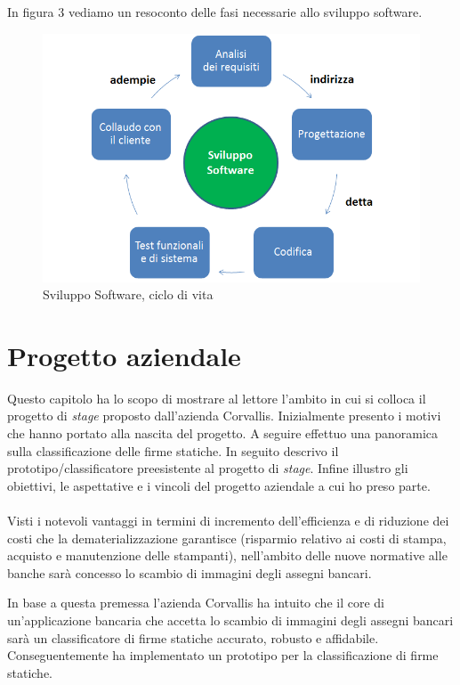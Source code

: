 In figura 3 vediamo un resoconto delle fasi necessarie allo sviluppo software.
\begin{figure}[H]
\centering
\includegraphics[scale=0.55]{../Logo&Header/sviluppoSoftware.png}
\caption{ Sviluppo Software, ciclo di vita}
\end{figure}

\newpage
\newpage

\section{Progetto aziendale}
\label{2.0}
Questo capitolo ha lo scopo di mostrare al lettore l'ambito in cui si colloca il progetto di \emph{stage} proposto dall'azienda Corvallis. Inizialmente presento i motivi che hanno portato alla nascita del progetto. A seguire effettuo una panoramica sulla classificazione delle firme statiche. In seguito descrivo il prototipo/classificatore preesistente al progetto di \emph{stage}. Infine illustro gli obiettivi, le aspettative e i vincoli del progetto aziendale a cui ho preso parte.\\\\
Visti i notevoli vantaggi in termini di incremento dell'efficienza e di riduzione dei costi che la \gls{dematerializzazione} garantisce (risparmio relativo ai costi di stampa, acquisto e manutenzione delle stampanti), nell'ambito delle nuove normative alle banche sarà concesso lo scambio di immagini degli assegni bancari. 

In base a questa premessa l'azienda Corvallis ha intuito che il core di un'applicazione bancaria che accetta lo scambio di immagini degli assegni bancari sarà un classificatore di firme statiche accurato, robusto e affidabile. Conseguentemente ha implementato un prototipo per la classificazione di firme statiche.

